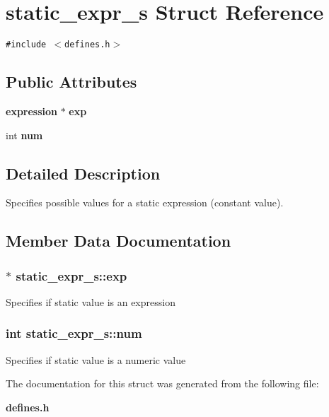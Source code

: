\section{static\_\-expr\_\-s  Struct Reference}
\label{structstatic__expr__s}
{\tt \#include $<$defines.h$>$}

\subsection*{Public Attributes}
\begin{CompactItemize}
\item 
{\bf expression} $\ast$ {\bf exp}
\item 
int {\bf num}
\end{CompactItemize}


\subsection{Detailed Description}
Specifies possible values for a static expression (constant value). 



\subsection{Member Data Documentation}
\subsubsection{$\ast$ static\_\-expr\_\-s::exp}\label{structstatic__expr__s_m0}


Specifies if static value is an expression 
\subsubsection{\setlength{\rightskip}{0pt plus 5cm}int static\_\-expr\_\-s::num}\label{structstatic__expr__s_m1}


Specifies if static value is a numeric value 

The documentation for this struct was generated from the following file:\begin{CompactItemize}
\item 
{\bf defines.h}\end{CompactItemize}
